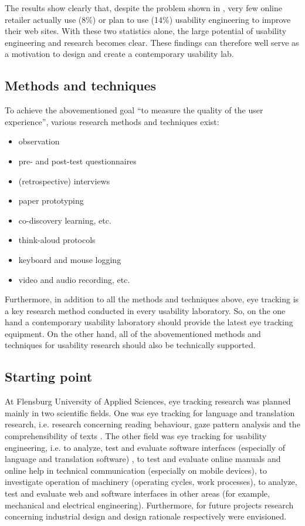 \documentclass[output=paper]{langsci/langscibook}
\begin{document}
The results show clearly that, despite the problem shown in , very few online retailer actually use (8\%) or plan to use (14\%) usability engineering to improve their web sites. With these two statistics alone, the large potential of usability engineering and research becomes clear. These findings can therefore well serve as a motivation to design and create a contemporary usability lab.

\subsection{Methods and techniques}

To achieve the abovementioned goal ``to measure the quality of the user experience'', various research methods and techniques exist:

\begin{itemize}
\item observation
\item pre- and post-test questionnaires 
\item (retrospective) interviews 
\item paper prototyping 
\item co-discovery learning, etc.
\item think-aloud protocols 
\item keyboard and mouse logging 
\item video and audio recording, etc. 
\end{itemize}

Furthermore, in addition to all the methods and techniques above, eye tracking is a key research method conducted in every usability laboratory. So, on the one hand a contemporary usability laboratory should provide the latest eye tracking equipment. On the other hand, all of the abovementioned methods and techniques for usability research should also be technically supported.

\subsection{Starting point}

At Flensburg University of Applied Sciences, eye tracking research was planned mainly in two scientific fields. One was eye tracking for language and translation research, i.e. research concerning reading behaviour, gaze pattern analysis and the comprehensibility of texts \citep{Hennig2007}. The other field was eye tracking for usability engineering, i.e. to analyze, test and evaluate software interfaces (especially of language and translation software) \citep{HansenSchirra2013}, to test and evaluate online manuals and online help in technical communication (especially on mobile devices), to investigate operation of machinery (operating cycles, work processes), to analyze, test and evaluate web and software interfaces in other areas (for example, mechanical and electrical engineering). Furthermore, for future projects research concerning industrial design and design rationale respectively were envisioned.
\end{document}
